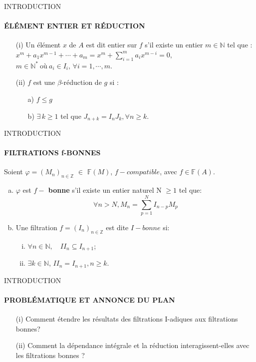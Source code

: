 \documentclass[11pt,a4paper]{beamer}
\begin{document}
	
	\begin{frame}{INTRODUCTION}
		\framesubtitle{ÉLÉMENT ENTIER ET RÉDUCTION}
		\begin{block}{}
			\begin{enumerate}
				\item[(i)] Un élément $x$ de $A$ est dit entier sur $f$ s'il existe un entier $m \in \mathbb{N}$ tel que : $x^m + a_1 x^{m-1} + \cdots + a_m = x^m + \sum_{i=1}^{m} a_i x^{m-i} = 0,$\\$ m \in \mathbb{N^*} \ \text{où} \ a_i \in I_i,\, \forall i=1, \cdots ,m.$
				\item[(ii)] $f$ est une $\beta$-réduction de $g$ si : \\
				\begin{enumerate}
					\item[a)] $f \leq g$
					\item[b)]  $\exists \, k \geq 1$ tel que $J_{n+k} = I_n J_k , \forall n \geq k$.
				\end{enumerate}
			\end{enumerate}
		\end{block}
	\end{frame}
	
	\begin{frame}{INTRODUCTION}
		\framesubtitle{FILTRATIONS f-BONNES}
		\begin{block}{}
			Soient $\varphi=(M_n)_{n \in \mathbb{Z}}$ $\in$ $\mathbb{F}(M)$, $f-compatible$, avec $f \in \mathbb{F}(A)$.
			\begin{enumerate}[(a)]
				\item $\varphi$ est \textbf{$f-$ bonne} s'il existe un entier naturel N $\geqslant 1$ tel que:
				\[\forall n > N, M_{n}=\sum_{p=1}^{N}I_{n-p}M_{p} \]
				\item Une filtration $f=(I_n)_{n \in \mathbb{Z}}$ est dite $I-bonne$ si: 
				\begin{enumerate}[(i)]
					\item $\forall n \in \mathbb{N}, \quad II_n \subseteq I_{n+1}$;
					\item $\exists k \in \mathbb{N}$, $II_n = I_{n+1}, n\geqslant k$.
				\end{enumerate}
			\end{enumerate}
		\end{block}
	\end{frame}
	
	\begin{frame}{INTRODUCTION}
		\framesubtitle{PROBLÉMATIQUE ET ANNONCE DU PLAN}
		\begin{block}{}
			\begin{enumerate}
				\item[(i)] Comment étendre les résultats des filtrations I-adiques aux filtrations bonnes?
				\item[(ii)] Comment la dépendance intégrale et la réduction interagissent-elles avec les filtrations bonnes ?
			\end{enumerate}
		\end{block}
	\end{frame}
	
\end{document}
